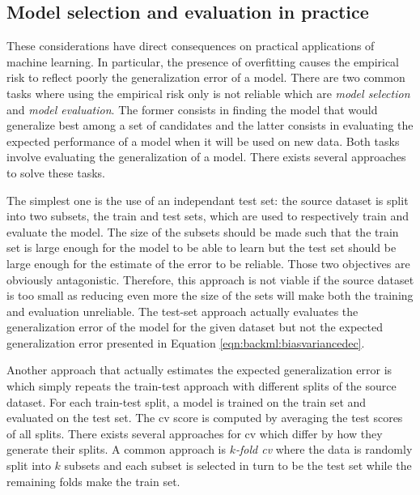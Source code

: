 \subsection{Model selection and evaluation in practice}
\label{ssec:backml:modelselinpractice}

These considerations have direct consequences on practical applications of machine
learning. In particular, the presence of overfitting causes the empirical risk to
reflect poorly the generalization error of a model. There are two common tasks
where using the empirical risk only is not reliable which are \textit{model selection}
and \textit{model evaluation}. The former consists in finding the model that would
generalize best among a set of candidates and the latter consists in evaluating
the expected performance of a model when it will be used on new data. Both tasks
involve evaluating the generalization of a model. There exists several approaches
to solve these tasks.

The simplest one is the use of an independant test set: the source dataset is
split into two subsets, the train and test sets, which are used to respectively
train and evaluate the model. The size of the subsets should be made such that
the train set is large enough for the model to be able to learn but the test set
should be large enough for the estimate of the error to be reliable. Those two
objectives are obviously antagonistic. Therefore, this approach is not viable if
the source dataset is too small as reducing even more the size of the sets will
make both the training and evaluation unreliable. The test-set approach actually
evaluates the generalization error of the model for the given dataset but not the
expected generalization error presented in Equation \ref{eqn:backml:biasvariancedec}.

Another approach that actually estimates the expected generalization error is
 which simply repeats the train-test approach with different splits
of the source dataset. For each train-test split, a model is trained on the train
set and evaluated on the test set. The \acrlong{cv} score is computed by averaging
the test scores of all splits. There exists several approaches for \acrlong{cv}
which differ by how they generate their splits. A common approach is
\textit{$k$-fold \acrlong{cv}} where the data is randomly split into $k$ subsets
and each subset is selected in turn to be the test set while the remaining folds
make the train set.

